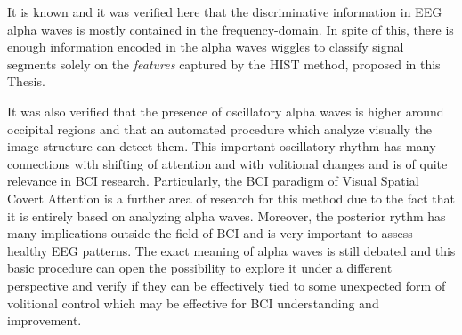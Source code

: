 It is known and it was verified here that the discriminative information in EEG alpha waves is mostly contained in the frequency-domain.  In spite of this,  there is enough information encoded in the alpha waves wiggles to classify signal segments solely on the \textit{features} captured by the HIST method, proposed in this Thesis.  

It was also verified that the presence of oscillatory alpha waves is higher around occipital regions and that an automated procedure which analyze visually the image structure can detect them. This important oscillatory rhythm has many connections with shifting of attention and with volitional changes and is of quite relevance in BCI research.  Particularly, the BCI paradigm of Visual Spatial Covert Attention is a further area of research for this method due to the fact that it is entirely based on analyzing alpha waves. Moreover, the posterior rythm has many implications outside the field of BCI and is very important to assess healthy EEG patterns. The exact meaning of alpha waves is still debated\cite{Ahn2013} and this basic procedure can open the possibility to explore it under a different perspective and verify if they can be effectively tied to some unexpected form of volitional control which may be effective for BCI understanding and improvement.

%





